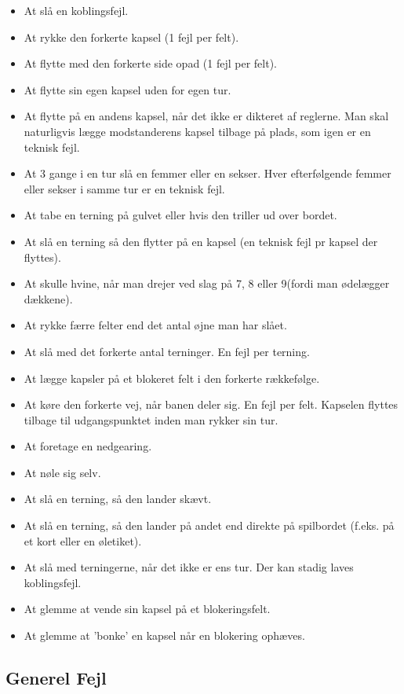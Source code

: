 \documentclass[12pt]{article}
\begin{document}
\begin{itemize}
	\item At slå en koblingsfejl.
	\item At rykke den forkerte kapsel (1 fejl per felt).
	\item At flytte med den forkerte side opad (1 fejl per felt).
	\item At flytte sin egen kapsel uden for egen tur.
	\item At flytte på en andens kapsel, når det ikke er dikteret af reglerne. Man skal naturligvis lægge modstanderens kapsel tilbage på plads, som igen er en teknisk fejl.
	\item At 3 gange i en tur slå en femmer eller en sekser. Hver efterfølgende femmer eller sekser i samme tur er en teknisk fejl.
	\item At tabe en terning på gulvet eller hvis den triller ud over bordet.
	\item At slå en terning så den flytter på en kapsel (en teknisk fejl pr kapsel der flyttes).
	\item At skulle hvine, når man drejer ved slag på 7, 8 eller 9(fordi man ødelægger dækkene).
	\item At rykke færre felter end det antal øjne man har slået.
	\item At slå med det forkerte antal terninger. En fejl per terning.
	\item At lægge kapsler på et blokeret felt i den forkerte rækkefølge.
	\item At køre den forkerte vej, når banen deler sig. En fejl per felt. Kapselen flyttes tilbage til udgangspunktet inden man rykker sin tur.
	\item At foretage en nedgearing.
	\item At nøle sig selv.
	\item At slå en terning, så den lander skævt.
	\item At slå en terning, så den lander på andet end direkte på spilbordet (f.eks. på et kort eller en øletiket).
	\item At slå med terningerne, når det ikke er ens tur. Der kan stadig laves koblingsfejl.
	\item At glemme at vende sin kapsel på et blokeringsfelt.
	\item At glemme at 'bonke' en kapsel når en blokering ophæves.
\end{itemize}


\subsection*{Generel Fejl}
\end{document}
